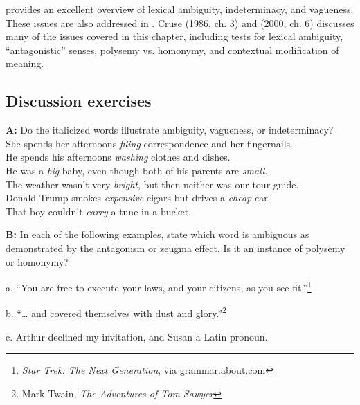 \furtherreading



\citet{Kennedy2011} provides an excellent overview of lexical ambiguity, indeterminacy, and vagueness. These issues are also addressed in \citet{Gillon1990}. Cruse (1986, ch. 3) and (2000, ch. 6) discusses many of the issues covered in this chapter, including tests for lexical ambiguity, “antagonistic” senses, polysemy vs. homonymy, and contextual modification of meaning.


\subsection*{Discussion exercises}
\ea
\textbf{A:} Do the italicized words illustrate ambiguity, vagueness, or indeterminacy?\\
\ea She spends her afternoons \textit{filing} correspondence and her fingernails.\\
\ex He spends his afternoons \textit{washing} clothes and dishes.\\
\ex He was a \textit{big} baby, even though both of his parents are \textit{small}.\\
\ex The weather wasn’t very \textit{bright}, but then neither was our tour guide.\\
\ex Donald Trump smokes \textit{expensive} cigars but drives a \textit{cheap} car.\\
\ex That boy couldn’t \textit{carry} a tune in a bucket.
                       \z
\z

\begin{stylepoints}
\textbf{B:} In each of the following examples, state which word is ambiguous as demonstrated by the antagonism or zeugma effect. Is it an instance of polysemy or homonymy?
\end{stylepoints}

\begin{stylepoints}
  a. “You are free to execute your laws, and your citizens, as you see fit.”\footnote{\textit{Star Trek: The Next Generation}, via grammar.about.com}
\end{stylepoints}

\begin{stylepoints}
  b. “… and covered themselves with dust and glory.”\footnote{Mark Twain, \textit{The Adventures of Tom Sawyer}}
\end{stylepoints}

\begin{stylepoints}
  c. Arthur declined my invitation, and Susan a Latin pronoun.
\end{stylepoints}

